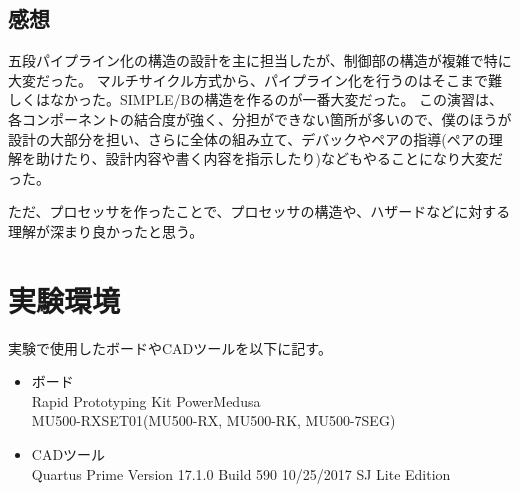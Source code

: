 \documentclass[a4j,titlepage]{jarticle}
\begin{document}
\subsection{感想}
五段パイプライン化の構造の設計を主に担当したが、制御部の構造が複雑で特に大変だった。
マルチサイクル方式から、パイプライン化を行うのはそこまで難しくはなかった。SIMPLE/Bの構造を作るのが一番大変だった。
この演習は、各コンポーネントの結合度が強く、分担ができない箇所が多いので、僕のほうが設計の大部分を担い、さらに全体の組み立て、デバックやペアの指導(ペアの理解を助けたり、設計内容や書く内容を指示したり)などもやることになり大変だった。

ただ、プロセッサを作ったことで、プロセッサの構造や、ハザードなどに対する理解が深まり良かったと思う。

\section{実験環境}
実験で使用したボードやCADツールを以下に記す。

\begin{itemize}
\item ボード \\Rapid Prototyping Kit PowerMedusa \\ MU500-RXSET01(MU500-RX, MU500-RK, MU500-7SEG) %
\item CADツール \\ Quartus Prime Version 17.1.0 Build 590 10/25/2017 SJ Lite Edition
\end{itemize}
\end{document}
